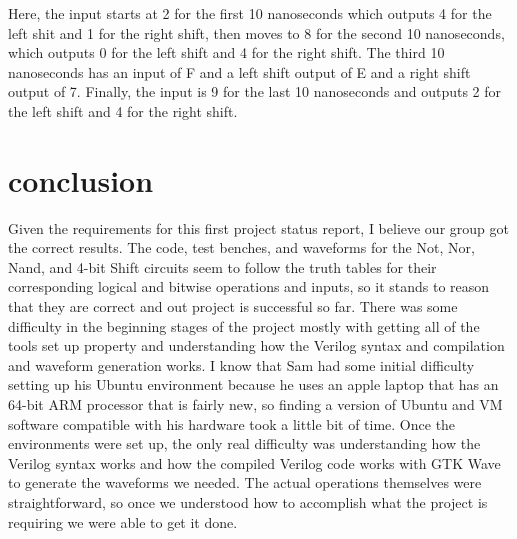 \documentclass[runningheads, 12pt]{report}
\begin{document}
Here, the input starts at 2 for the first 10 nanoseconds which outputs 4 for the left shit and 1 for the right shift, then moves to 8 for the second 10 nanoseconds, which outputs 0 for the left shift and 4 for the right shift. The third 10 nanoseconds has an input of F and a left shift output of E and a right shift output of 7. Finally, the input is 9 for the last 10 nanoseconds and outputs 2 for the left shift and 4 for the right shift.  \pagebreak

\chapter{conclusion}

	Given the requirements for this first project status report, I believe our group got the correct results. The code, test benches, and waveforms for the Not, Nor, Nand, and 4-bit Shift circuits seem to follow the truth tables for their corresponding logical and bitwise operations and inputs, so it stands to reason that they are correct and out project is successful so far. There was some difficulty in the beginning stages of the project mostly with getting all of the tools set up property and understanding how the Verilog syntax and compilation and waveform generation works. I know that Sam had some initial difficulty setting up his Ubuntu environment because he uses an apple laptop that has an 64-bit ARM processor that is fairly new, so finding a version of Ubuntu and VM software compatible with his hardware took a little bit of time. Once the environments were set up, the only real difficulty was understanding how the Verilog syntax works and how the compiled Verilog code works with GTK Wave to generate the waveforms we needed. The actual operations themselves were straightforward, so once we understood how to accomplish what the project is requiring we were able to get it done. 	
\end{document}
